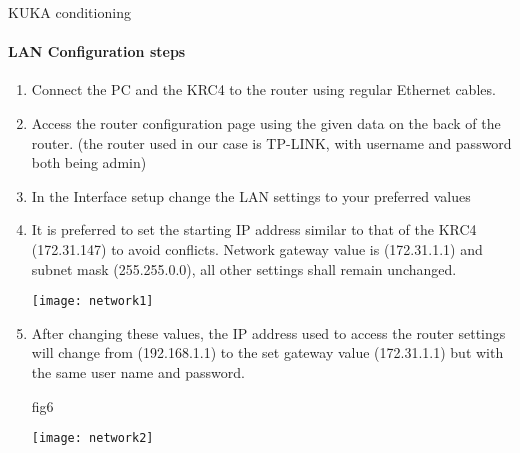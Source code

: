 \documentclass{book}
\begin{document}
\begin{chapter}{KUKA conditioning}
			
			\paragraph{LAN Configuration steps}
			\begin{enumerate}
				\item Connect the PC and the KRC4 to the router using regular Ethernet cables.
				\item Access the router configuration page using the given data on the back of the router. (the router used in our case is TP-LINK, with username and password both being admin)
				\item In the Interface setup change the LAN settings to your preferred values
				\item It is preferred to set the starting IP address similar to that of the KRC4 (172.31.147) to avoid conflicts. Network gateway value is (172.31.1.1) and subnet mask (255.255.0.0), all other settings shall remain unchanged.
				
				\begin{center}
					\texttt{[image: network1]}
				\end{center}
				
		
				
				\item After changing these values, the IP address used to access the router settings will change from (192.168.1.1) to the set gateway value (172.31.1.1) but with the same user name and password.
				
				fig6
				
				\begin{center}
				\texttt{[image: network2]}
				\end{center}
				

\end{enumerate}
\end{chapter}
\end{document}
